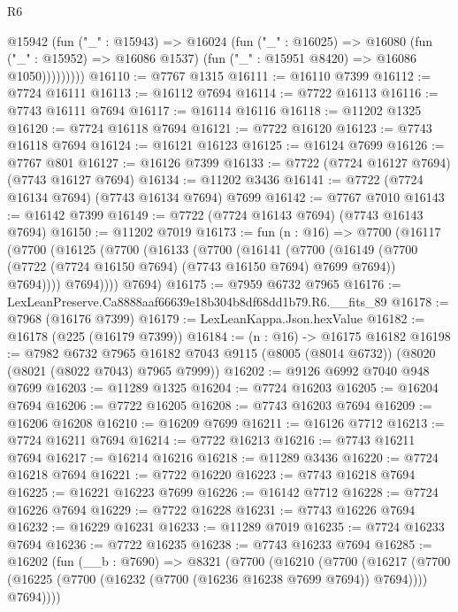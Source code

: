 \begin{lexlean}{R6}
\begin{coremodule}
              @15942
                (fun ("_" : @15943) =>
                @16024
                  (fun ("_" : @16025) =>
                  @16080
                    (fun ("_" : @15952) => @16086 @1537)
                    (fun ("_" : @15951 @8420) => @16086 @1050)))))))))
@16110 := @7767 @1315
@16111 := @16110 @7399
@16112 := @7724 @16111
@16113 := @16112 @7694
@16114 := @7722 @16113
@16116 := @7743 @16111 @7694
@16117 := @16114 @16116
@16118 := @11202 @1325
@16120 := @7724 @16118 @7694
@16121 := @7722 @16120
@16123 := @7743 @16118 @7694
@16124 := @16121 @16123
@16125 := @16124 @7699
@16126 := @7767 @801
@16127 := @16126 @7399
@16133 := @7722 (@7724 @16127 @7694) (@7743 @16127 @7694)
@16134 := @11202 @3436
@16141 := @7722 (@7724 @16134 @7694) (@7743 @16134 @7694) @7699
@16142 := @7767 @7010
@16143 := @16142 @7399
@16149 := @7722 (@7724 @16143 @7694) (@7743 @16143 @7694)
@16150 := @11202 @7019
@16173 := fun (n : @16) =>
  @7700
    (@16117
      (@7700
        (@16125
          (@7700
            (@16133
              (@7700
                (@16141
                  (@7700
                    (@16149
                      (@7700 (@7722 (@7724 @16150 @7694) (@7743 @16150 @7694) @7699 @7694))
                      @7694))))
              @7694))))
      @7694)
@16175 := @7959 @6732 @7965
@16176 := LexLeanPreserve.Ca8888aaf66639e18b304b8df68dd1b79.R6.__fits_89
@16178 := @7968 (@16176 @7399)
@16179 := LexLeanKappa.Json.hexValue
@16182 := @16178 (@225 (@16179 @7399))
@16184 := (n : @16) -> @16175 @16182
@16198 := @7982
    @6732
    @7965
    @16182
    @7043
    @9115
    (@8005 (@8014 @6732))
    (@8020 (@8021 (@8022 @7043) @7965 @7999))
@16202 := @9126 @6992 @7040 @948 @7699
@16203 := @11289 @1325
@16204 := @7724 @16203
@16205 := @16204 @7694
@16206 := @7722 @16205
@16208 := @7743 @16203 @7694
@16209 := @16206 @16208
@16210 := @16209 @7699
@16211 := @16126 @7712
@16213 := @7724 @16211 @7694
@16214 := @7722 @16213
@16216 := @7743 @16211 @7694
@16217 := @16214 @16216
@16218 := @11289 @3436
@16220 := @7724 @16218 @7694
@16221 := @7722 @16220
@16223 := @7743 @16218 @7694
@16225 := @16221 @16223 @7699
@16226 := @16142 @7712
@16228 := @7724 @16226 @7694
@16229 := @7722 @16228
@16231 := @7743 @16226 @7694
@16232 := @16229 @16231
@16233 := @11289 @7019
@16235 := @7724 @16233 @7694
@16236 := @7722 @16235
@16238 := @7743 @16233 @7694
@16285 := @16202
    (fun (__b : @7690) =>
    @8321
      (@7700
        (@16210
          (@7700
            (@16217
              (@7700 (@16225 (@7700 (@16232 (@7700 (@16236 @16238 @7699 @7694)) @7694))))
              @7694))))

\end{coremodule}
\end{lexlean}
